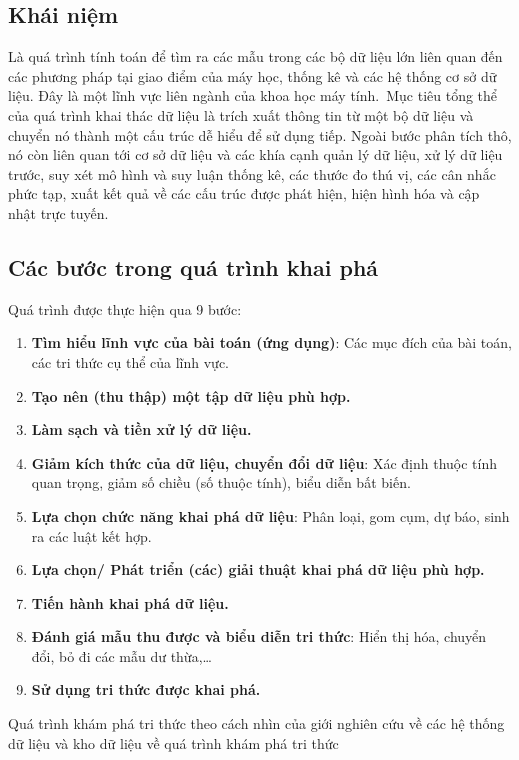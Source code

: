 \subsection{Khái niệm}
Là quá trình tính toán để tìm ra các mẫu trong các bộ dữ liệu lớn liên quan đến các phương pháp tại giao điểm của máy học, thống kê và các hệ thống cơ sở dữ liệu. 
Đây là một lĩnh vực liên ngành của khoa học máy tính. Mục tiêu tổng thể của quá trình khai thác dữ liệu là trích xuất thông tin từ một bộ dữ liệu và chuyển nó thành một cấu trúc dễ hiểu để sử dụng tiếp. 
Ngoài bước phân tích thô, nó còn liên quan tới cơ sở dữ liệu và các khía cạnh quản lý dữ liệu, xử lý dữ liệu trước, suy xét mô hình và suy luận thống kê, các thước đo thú vị, các cân nhắc phức tạp, xuất kết quả về các cấu trúc được phát hiện, hiện hình hóa và cập nhật trực tuyến.
\subsection{Các bước trong quá trình khai phá}
Quá trình được thực hiện qua 9 bước:
\begin{enumerate}
    \item \textbf{Tìm hiểu lĩnh vực của bài toán (ứng dụng)}: Các mục đích của bài toán,
    các tri thức cụ thể của lĩnh vực.
    \item \textbf{Tạo nên (thu thập) một tập dữ liệu phù hợp.}
    \item \textbf{Làm sạch và tiền xử lý dữ liệu.}
    \item \textbf{Giảm kích thức của dữ liệu, chuyển đổi dữ liệu}: Xác định thuộc tính quan
    trọng, giảm số chiều (số thuộc tính), biểu diễn bất biến.
    \item \textbf{Lựa chọn chức năng khai phá dữ liệu}: Phân loại, gom cụm, dự báo, sinh
    ra các luật kết hợp.
    \item \textbf{Lựa chọn/ Phát triển (các) giải thuật khai phá dữ liệu phù hợp.}
    \item \textbf{Tiến hành khai phá dữ liệu.}
    \item \textbf{Đánh giá mẫu thu được và biểu diễn tri thức}: Hiển thị hóa, chuyển đổi, bỏ
    đi các mẫu dư thừa,…
    \item \textbf{Sử dụng tri thức được khai phá.}
\end{enumerate}
Quá trình khám phá tri thức theo cách nhìn của giới nghiên cứu về các hệ
thống dữ liệu và kho dữ liệu về quá trình khám phá tri thức
